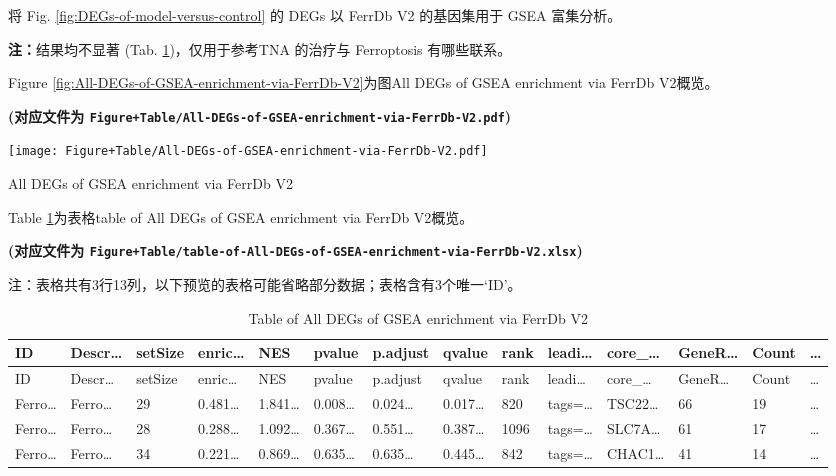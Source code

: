 \documentclass[
]{article}
\begin{document}
将 Fig. \ref{fig:DEGs-of-model-versus-control} 的 DEGs 以 FerrDb V2 的基因集用于 GSEA 富集分析。

\textbf{注：}结果均不显著 (Tab. \ref{tab:table-of-All-DEGs-of-GSEA-enrichment-via-FerrDb-V2})，仅用于参考TNA 的治疗与 Ferroptosis 有哪些联系。

Figure \ref{fig:All-DEGs-of-GSEA-enrichment-via-FerrDb-V2}为图All DEGs of GSEA enrichment via FerrDb V2概览。

\textbf{(对应文件为 \texttt{Figure+Table/All-DEGs-of-GSEA-enrichment-via-FerrDb-V2.pdf})}

\def\@captype{figure}
\begin{center}
\texttt{[image: Figure+Table/All-DEGs-of-GSEA-enrichment-via-FerrDb-V2.pdf]}
\caption{All DEGs of GSEA enrichment via FerrDb V2}\label{fig:All-DEGs-of-GSEA-enrichment-via-FerrDb-V2}
\end{center}

Table \ref{tab:table-of-All-DEGs-of-GSEA-enrichment-via-FerrDb-V2}为表格table of All DEGs of GSEA enrichment via FerrDb V2概览。

\textbf{(对应文件为 \texttt{Figure+Table/table-of-All-DEGs-of-GSEA-enrichment-via-FerrDb-V2.xlsx})}

\begin{center}\begin{tcolorbox}[colback=gray!10, colframe=gray!50, width=0.9\linewidth, arc=1mm, boxrule=0.5pt]注：表格共有3行13列，以下预览的表格可能省略部分数据；表格含有3个唯一`ID'。
\end{tcolorbox}
\end{center}

\begin{longtable}[]{@{}llllllllllllll@{}}
\caption{\label{tab:table-of-All-DEGs-of-GSEA-enrichment-via-FerrDb-V2}Table of All DEGs of GSEA enrichment via FerrDb V2}\tabularnewline
\toprule
ID & Descr\ldots{} & setSize & enric\ldots{} & NES & pvalue & p.adjust & qvalue & rank & leadi\ldots{} & core\_\ldots{} & GeneR\ldots{} & Count & \ldots{}\tabularnewline
\midrule
\endfirsthead
\toprule
ID & Descr\ldots{} & setSize & enric\ldots{} & NES & pvalue & p.adjust & qvalue & rank & leadi\ldots{} & core\_\ldots{} & GeneR\ldots{} & Count & \ldots{}\tabularnewline
\midrule
\endhead
Ferro\ldots{} & Ferro\ldots{} & 29 & 0.481\ldots{} & 1.841\ldots{} & 0.008\ldots{} & 0.024\ldots{} & 0.017\ldots{} & 820 & tags=\ldots{} & TSC22\ldots{} & 66 & 19 & \ldots{}\tabularnewline
Ferro\ldots{} & Ferro\ldots{} & 28 & 0.288\ldots{} & 1.092\ldots{} & 0.367\ldots{} & 0.551\ldots{} & 0.387\ldots{} & 1096 & tags=\ldots{} & SLC7A\ldots{} & 61 & 17 & \ldots{}\tabularnewline
Ferro\ldots{} & Ferro\ldots{} & 34 & 0.221\ldots{} & 0.869\ldots{} & 0.635\ldots{} & 0.635\ldots{} & 0.445\ldots{} & 842 & tags=\ldots{} & CHAC1\ldots{} & 41 & 14 & \ldots{}\tabularnewline
\bottomrule
\end{longtable}
\end{document}
